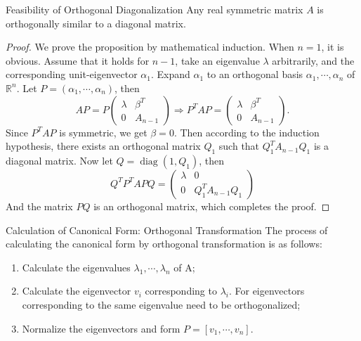 \begin{proposition}{Feasibility of Orthogonal Diagonalization}{}
  Any real symmetric matrix $A$ is orthogonally similar to a diagonal matrix.
\end{proposition}

\begin{proof}
  We prove the proposition by mathematical induction.
  When $n = 1$, it is obvious.
  Assume that it holds for $n - 1$, take an eigenvalue $\lambda$ arbitrarily,
  and the corresponding unit-eigenvector $\alpha_1$.
  Expand $\alpha_1$ to an orthogonal basis $\alpha_1,\cdots,\alpha_n$ of
  $\mathbb{R}^n$.
  Let $P = (\alpha_1,\cdots,\alpha_n)$, then
  \begin{equation}
    AP = P \begin{pmatrix}
        \lambda&\beta^T\\
        0&A_{n-1}
      \end{pmatrix}
    \Rightarrow
    P^TAP=
    \begin{pmatrix}
      \lambda&\beta^T\\
      0&A_{n-1}
    \end{pmatrix}.
  \end{equation}
  Since $P^TAP$ is symmetric, we get $\beta = 0$.
  Then according to the induction hypothesis, there exists an orthogonal matrix $Q_1$
  such that $Q_1^T A_{n-1}Q_1$ is a diagonal matrix.
  Now let $Q = \operatorname{diag}(1, Q_1)$, then
  \begin{equation}
    Q^TP^TAPQ =
    \begin{pmatrix}
      \lambda & 0\\
      0 & Q_1^TA_{n-1}Q_1
    \end{pmatrix}
  \end{equation}
  And the matrix $PQ$ is an orthogonal matrix, which completes the proof.
\end{proof}

\begin{proposition}{Calculation of Canonical Form: Orthogonal Transformation}{}
  The process of calculating the canonical form by orthogonal transformation is
  as follows:
  \begin{enumerate}
  \item Calculate the eigenvalues $\lambda_1,\cdots,\lambda_n$ of A;
  \item Calculate the eigenvector $v_i$ corresponding to $\lambda_i$.
    For eigenvectors corresponding to the same eigenvalue need to be orthogonalized;
  \item Normalize the eigenvectors and form $P = [v_1,\cdots,v_n]$.
  \end{enumerate}
\end{proposition}

